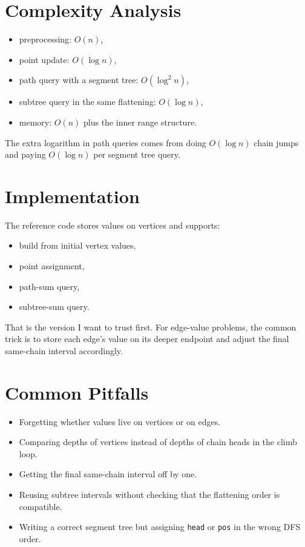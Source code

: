 \section*{Complexity Analysis}

\begin{itemize}
  \item preprocessing: \(O(n)\),
  \item point update: \(O(\log n)\),
  \item path query with a segment tree: \(O(\log^2 n)\),
  \item subtree query in the same flattening: \(O(\log n)\),
  \item memory: \(O(n)\) plus the inner range structure.
\end{itemize}

The extra logarithm in path queries comes from doing \(O(\log n)\) chain jumps and paying \(O(\log n)\) per segment
tree query.

\section*{Implementation}

The reference code stores values on vertices and supports:

\begin{itemize}
  \item build from initial vertex values,
  \item point assignment,
  \item path-sum query,
  \item subtree-sum query.
\end{itemize}

That is the version I want to trust first. For edge-value problems, the common trick is to store each edge's value on
its deeper endpoint and adjust the final same-chain interval accordingly.

\section*{Common Pitfalls}

\begin{itemize}
  \item Forgetting whether values live on vertices or on edges.
  \item Comparing depths of vertices instead of depths of chain heads in the climb loop.
  \item Getting the final same-chain interval off by one.
  \item Reusing subtree intervals without checking that the flattening order is compatible.
  \item Writing a correct segment tree but assigning \texttt{head} or \texttt{pos} in the wrong DFS order.
\end{itemize}

